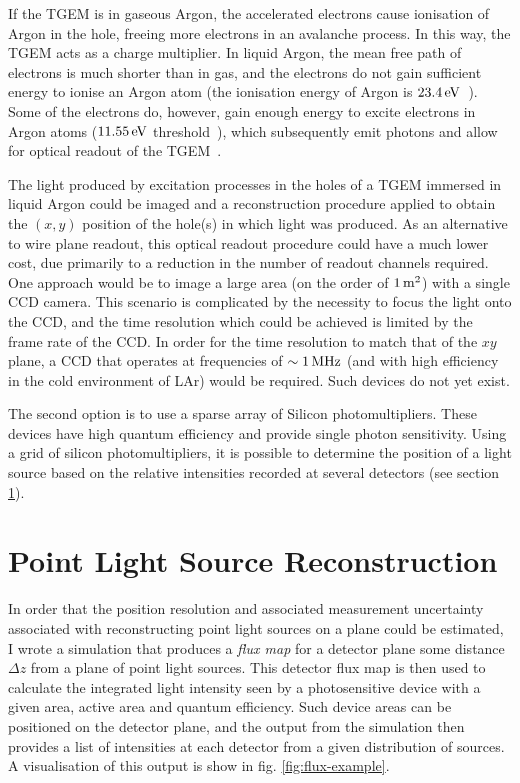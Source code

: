 If the \ac{TGEM} is in gaseous Argon, the accelerated electrons cause ionisation of Argon in the hole, freeing more electrons in an avalanche process. In this way, the \ac{TGEM} acts as a charge multiplier. In liquid Argon, the mean free path of electrons is much shorter than in gas, and the electrons do not gain sufficient energy to ionise an Argon atom (the ionisation energy of Argon is $23.4\eV$~\citep{Aprile2006}). Some of the electrons do, however, gain enough energy to excite electrons in Argon atoms ($11.55\eV$ threshold~\citep{Stewart2010}), which subsequently emit photons and allow for optical readout of the \ac{TGEM}~\citep{Lightfoot2009}.

The light produced by excitation processes in the holes of a \ac{TGEM} immersed in liquid Argon could be imaged and a reconstruction procedure applied to obtain the $(x,y)$ position of the hole(s) in which light was produced. As an alternative to wire plane readout, this optical readout procedure could have a much lower cost, due primarily to a reduction in the number of readout channels required. One approach would be to image a large area (on the order of $1 \metre^2$) with a single \ac{CCD} camera. This scenario is complicated by the necessity to focus the light onto the \ac{CCD}, and the time resolution which could be achieved is limited by the frame rate of the \ac{CCD}. In order for the time resolution to match that of the $xy$ plane, a \ac{CCD} that operates at frequencies of $\sim 1\MHz$ (and with high efficiency in the cold environment of \ac{LAr}) would be required. Such devices do not yet exist.

The second option is to use a sparse array of Silicon photomultipliers. These devices have high quantum efficiency and provide single photon sensitivity. Using a grid of silicon photomultipliers, it is possible to determine the position of a light source based on the relative intensities recorded at several detectors (see section \ref{sec:point-source-recon}).

\section{Point Light Source Reconstruction}\label{sec:point-source-recon}
In order that the position resolution and associated measurement uncertainty associated with reconstructing point light sources on a plane could be estimated, I wrote a simulation that produces a \emph{flux map} for a detector plane some distance $\Delta z$ from a plane of point light sources. This detector flux map is then used to calculate the integrated light intensity seen by a photosensitive device with a given area, active area and quantum efficiency. Such device areas can be positioned on the detector plane, and the output from the simulation then provides a list of intensities at each detector from a given distribution of sources. A visualisation of this output is show in fig. \ref{fig:flux-example}.

